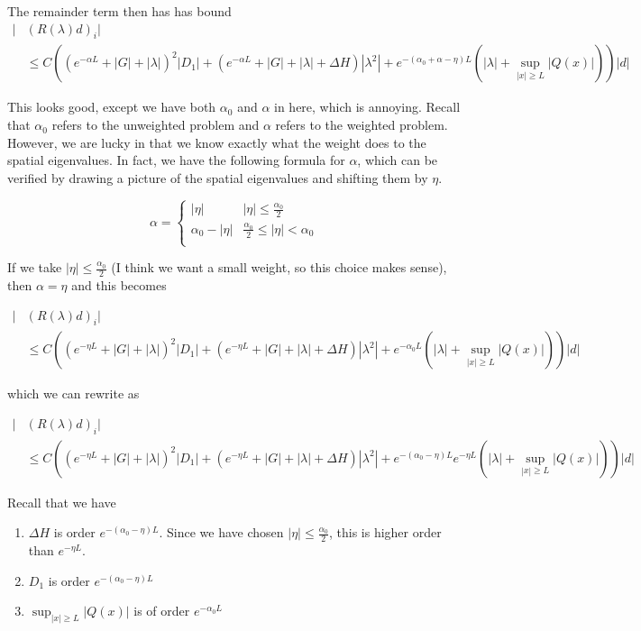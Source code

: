 \documentclass[12pt]{article}
\begin{document}
The remainder term then has has bound
\begin{align*}
|&(R(\lambda)d)_i| \\
&\leq C \left( (e^{-\alpha L} + |G| + |\lambda|)^2 |D_1| + (e^{-\alpha L} + |G| + |\lambda| + \Delta H )|\lambda^2|  + e^{-(\alpha_0 + \alpha - \eta ) L}( |\lambda| +  \sup_{|x| \geq L} |Q(x)| ) \right)|d|
\end{align*}

This looks good, except we have both $\alpha_0$ and $\alpha$ in here, which is annoying. Recall that $\alpha_0$ refers to the unweighted problem and $\alpha$ refers to the weighted problem. However, we are lucky in that we know exactly what the weight does to the spatial eigenvalues. In fact, we have the following formula for $\alpha$, which can be verified by drawing a picture of the spatial eigenvalues and shifting them by $\eta$.

\begin{equation}
\alpha = \begin{cases}
|\eta| & |\eta| \leq \frac{\alpha_0}{2} \\
\alpha_0 - |\eta| & \frac{\alpha_0}{2} \leq |\eta| < \alpha_0 \\
\end{cases}
\end{equation}

If we take $|\eta| \leq \frac{\alpha_0}{2}$ (I think we want a small weight, so this choice makes sense), then $\alpha = \eta$ and this becomes

\begin{align*}
|&(R(\lambda)d)_i| \\
&\leq C \left( (e^{-\eta L} + |G| + |\lambda|)^2 |D_1| + (e^{-\eta L} + |G| + |\lambda| + \Delta H )|\lambda^2|  + e^{-\alpha_0 L}( |\lambda| +  \sup_{|x| \geq L} |Q(x)| ) \right)|d|
\end{align*}

which we can rewrite as

\begin{align*}
|&(R(\lambda)d)_i| \\
&\leq C \left( (e^{-\eta L} + |G| + |\lambda|)^2 |D_1| + (e^{-\eta L} + |G| + |\lambda| + \Delta H )|\lambda^2|  + e^{-(\alpha_0 - \eta) L}e^{-\eta L}( |\lambda| +  \sup_{|x| \geq L} |Q(x)| ) \right)|d|
\end{align*}

Recall that we have

\begin{enumerate}
	\item $\Delta H$ is order $e^{-(\alpha_0 - \eta)L}$. Since we have chosen $|\eta| \leq \frac{\alpha_0}{2}$, this is higher order than $e^{-\eta L}$.
	\item $D_1$ is order $e^{-(\alpha_0 - \eta) L}$
	\item $\sup_{|x| \geq L} |Q(x)| $ is of order $e^{-\alpha_0 L}$
\end{enumerate}
\end{document}
